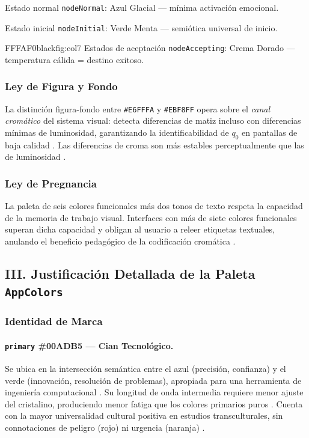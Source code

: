 %
  {Estado normal \texttt{nodeNormal}: Azul Glacial — mínima activación emocional.}

%
  {Estado inicial \texttt{nodeInitial}: Verde Menta — semiótica universal de inicio.}

 {FFFAF0}{black}{fig:col7}%
  {Estados de aceptación \texttt{nodeAccepting}: Crema Dorado — temperatura cálida = destino exitoso.}

\subsubsection*{Ley de Figura y Fondo}

La distinción figura-fondo entre \texttt{\#E6FFFA} y \texttt{\#EBF8FF} opera sobre el
\emph{canal cromático} del sistema visual: detecta diferencias de matiz incluso con diferencias
mínimas de luminosidad, garantizando la identificabilidad de $q_0$ en pantallas de baja calidad
\cite{koffka2013}. Las diferencias de croma son más estables perceptualmente que las de
luminosidad \cite{holtzschue2017}.

\subsubsection*{Ley de Pregnancia}

La paleta de seis colores funcionales más dos tonos de texto respeta la capacidad de la memoria
de trabajo visual. Interfaces con más de siete colores funcionales superan dicha capacidad y
obligan al usuario a releer etiquetas textuales, anulando el beneficio pedagógico de la
codificación cromática \cite{lidwell2010}.

\subsection*{\texorpdfstring{III.\; Justificación Detallada de la Paleta \texttt{AppColors}}{III. Justificación Detallada de la Paleta AppColors}}

\subsubsection*{Identidad de Marca}

\paragraph{\texorpdfstring{\texttt{primary}}{primary} \#00ADB5 — Cian Tecnológico.}
Se ubica en la intersección semántica entre el azul (precisión, confianza) y el verde (innovación,
resolución de problemas), apropiada para una herramienta de ingeniería computacional
\cite{heller2004}. Su longitud de onda intermedia requiere menor ajuste del cristalino, produciendo
menor fatiga que los colores primarios puros \cite{malamed2015}. Cuenta con la mayor universalidad
cultural positiva en estudios transculturales, sin connotaciones de peligro (rojo) ni urgencia
(naranja) \cite{holtzschue2017}.

